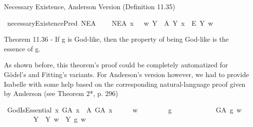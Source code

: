 \begin{isabellebody}
\begin{isamarkuptext}
Necessary Existence, Anderson Version (Definition 11.35)%
\end{isamarkuptext}\isamarkuptrue%
\isamarkupfalse%
\ necessaryExistencePred{\isacharcolon}{\isacharcolon}{\isachardoublequoteopen}{\isasymup}{\isasymlangle}{\isasymzero}{\isasymrangle}{\isachardoublequoteclose}\ {\isacharparenleft}{\isachardoublequoteopen}NE\isactrlsup A{\isachardoublequoteclose}{\isacharparenright}\ \isanewline
\ \ \ {\isachardoublequoteopen}NE\isactrlsup A\ x\ \ {\isasymequiv}\ {\isacharparenleft}{\isasymlambda}w{\isachardot}\ {\isacharparenleft}\isactrlbold {\isasymforall}Y{\isachardot}\ \ {\isasymE}\isactrlsup A\ Y\ x\ \isactrlbold {\isasymrightarrow}\ \isactrlbold {\isasymbox}\isactrlbold {\isasymexists}\isactrlsup E\ Y{\isacharparenright}\ w{\isacharparenright}{\isachardoublequoteclose}%
\begin{isamarkuptext}%
Theorem 11.36 - If g is God-like, then the property of being God-like is the essence of g.%
\end{isamarkuptext}\isamarkuptrue%
%
\begin{isamarkuptext}%
As shown before, this theorem's proof could be completely automatized for G\"odel's and Fitting's variants.
For Anderson's version however, we had to provide Isabelle with some help based on the corresponding natural-language proof 
given by Anderson (see \cite{anderson90:_some_emend_of_goedel_ontol_proof} Theorem 2*, p. 296)%
\end{isamarkuptext}\isamarkuptrue%
\isamarkupfalse%
\ GodIsEssential{\isacharcolon}\ {\isachardoublequoteopen}{\isasymlfloor}\isactrlbold {\isasymforall}x{\isachardot}\ G\isactrlsup A\ x\ \isactrlbold {\isasymrightarrow}\ {\isacharparenleft}{\isasymE}\isactrlsup A\ G\isactrlsup A\ x{\isacharparenright}{\isasymrfloor}{\isachardoublequoteclose}\isanewline
%
\isadelimproof
%
\endisadelimproof
%
\isatagproof
{}\isamarkupfalse%
\ {\isacharminus}\isanewline
\isacommand{{\isacharbraceleft}}\isamarkupfalse%
\isanewline
\ \ \isamarkupfalse%
\ w\isanewline
\ \ \isacommand{{\isacharbraceleft}}\isamarkupfalse%
\isanewline
\ \ \ \ \isamarkupfalse%
\ g\isanewline
\ \ \ \ \isacommand{{\isacharbraceleft}}\isamarkupfalse%
\isanewline
\ \ \ \ \ \ \isamarkupfalse%
\ {\isachardoublequoteopen}G\isactrlsup A\ g\ w{\isachardoublequoteclose}\isanewline
\ \ \ \ \ \ \isamarkupfalse%
\ {}{\isacharcolon}\ {\isachardoublequoteopen}{\isasymforall}Y{\isachardot}\ {\isacharparenleft}{\isasymP}\ Y\ w{\isacharparenright}\ {\isasymlongleftrightarrow}\ {\isacharparenleft}\isactrlbold {\isasymbox}{\isacharparenleft}Y\ g{\isacharparenright}{\isacharparenright}\ w{\isachardoublequoteclose}\ \isamarkupfalse%

\end{isabellebody}
